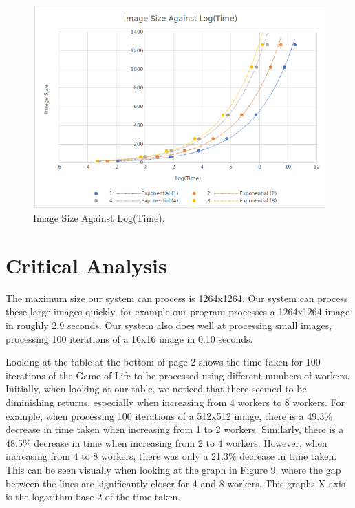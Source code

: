 \documentclass{article}
\begin{document}
\begin{figure}[H]
\centering
\includegraphics[width=15cm]{ImvsLog(Time)(BeforePow).png}
\caption{Image Size Against Log(Time).}
\end{figure}

\newpage



\section{Critical Analysis}
The maximum size our system can process is 1264x1264. Our system can process these large
images quickly, for example our program processes a 1264x1264 image in roughly 2.9 seconds. Our system
also does well at processing small images, processing 100 iterations of a 16x16 image in 0.10
seconds.

\vspace{3mm}

Looking at the table at the bottom of page 2 shows the time taken for
100 iterations of the Game-of-Life to be processed using different numbers of workers. Initially,
when looking at our table, we noticed that there seemed to be diminishing returns, especially when
increasing from 4 workers to 8 workers. For example, when processing 100 iterations of a 512x512
image, there is a 49.3\% decrease in time taken when increasing from 1 to 2 workers. Similarly,
there is a 48.5\% decrease in time when increasing from 2 to 4 workers. However, when increasing
from 4 to 8 workers, there was only a 21.3\% decrease in time taken. This can be seen visually when
looking at the graph in Figure 9, where the gap between the lines are significantly closer for 4
and 8 workers. This graphs X axis is the logarithm base 2 of the time taken.
\end{document}
